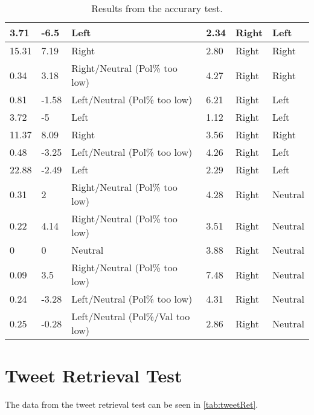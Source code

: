 \begin{table}[H]
{\begin{tabular}{|l|l|l|l|l|l|}
3.71	&	-6.5	&	Left								&	2.34	&	Right		&	Left	\\\hline
15.31	&	7.19	&	Right								&	2.80	&	Right		&	Right	\\\hline
0.34	&	3.18	&	Right/Neutral (Pol\% too low)		&	4.27	&	Right		&	Right	\\\hline
0.81	&	-1.58	&	Left/Neutral (Pol\% too low)		&	6.21	&	Right		&	Left	\\\hline
3.72	&	-5		&	Left								&	1.12	&	Right		&	Left	\\\hline
11.37	&	8.09	&	Right								&	3.56	&	Right		&	Right	\\\hline
0.48	&	-3.25	&	Left/Neutral (Pol\% too low)		&	4.26	&	Right		&	Left	\\\hline
22.88	&	-2.49	&	Left								&	2.29	&	Right		&	Left	\\\hline
0.31	&	2		&	Right/Neutral (Pol\% too low)		&	4.28	&	Right		&	Neutral	\\\hline
0.22	&	4.14	&	Right/Neutral (Pol\% too low)		&	3.51	&	Right		&	Neutral	\\\hline
0		&	0		&	Neutral								&	3.88	&	Right		&	Neutral	\\\hline
0.09	&	3.5		&	Right/Neutral (Pol\% too low)		&	7.48	&	Right		&	Neutral	\\\hline
0.24	&	-3.28	&	Left/Neutral (Pol\% too low)		&	4.31	&	Right		&	Neutral	\\\hline
0.25	&	-0.28	&	Left/Neutral (Pol\%/Val too low)	&	2.86	&	Right		&	Neutral	\\\hline

\end{tabular}}
\caption{Results from the accurary test.}
\label{speedTestRes3}
\end{table}





\chapter{Tweet Retrieval Test}\label{app:tweetRet}
The data from the tweet retrieval test can be seen in \autoref{tab:tweetRet}.



